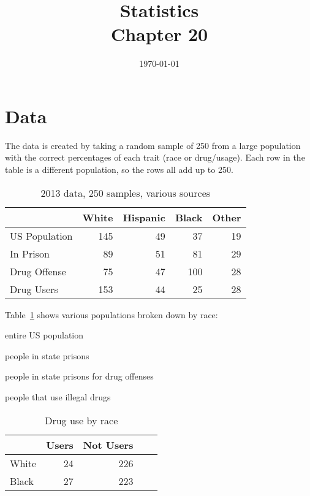\documentclass[letterpaper, landscape]{exam}
\title{Statistics \\ Chapter 20}
\date{\today}
\author{}
\begin{document}
  \maketitle
  \setcounter{tocdepth}{2}
  \tableofcontents

  \newpage

  \section{Data} %

  The data is created by taking a random sample of 250 from a large population
  with the correct percentages of each trait (race or drug/usage). Each row in the
  table is a different population, so the rows all add up to 250.

  \begin{table}
    \centering
    \begin{tabular}{lrrrr}
      \toprule
                     & White & Hispanic & Black & Other     \\
      \midrule                
      US Population  & 145   & 49       & 37    & 19       \\
      In Prison      & 89    & 51       & 81    & 29      \\
      Drug Offense   & 75    & 47       & 100   & 28      \\
      Drug Users     & 153   & 44       & 25    & 28       \\
      \bottomrule
    \end{tabular}
    \caption{2013 data, 250 samples, various sources}\label{tab:population}
  \end{table}

  Table~\ref{tab:population} shows various populations broken down by race:
  \begin{description}[parsep = 0pt]
    \item[US] entire US population
    \item[In Prison] people in state prisons 
    \item[Drug Offence] people in state prisons for drug offenses
    \item[Drug Users] people that use illegal drugs
  \end{description}

  \begin{table}
    \centering
    \begin{tabular}{lrrrr}
      \toprule
            & Users & Not Users      \\
      \midrule
      White & 24    & 226 \\
      Black & 27    & 223 \\
      \bottomrule
    \end{tabular}
    \caption{Drug use by race}\label{tab:by_race}
  \end{table}
\end{document}
